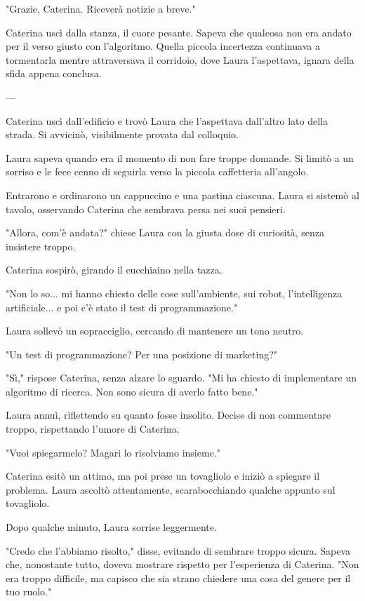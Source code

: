 "Grazie, Caterina. Riceverà notizie a breve."

Caterina uscì dalla stanza, il cuore pesante. Sapeva che qualcosa non era andato per il verso giusto con l'algoritmo. Quella piccola incertezza continuava a tormentarla mentre attraversava il corridoio, dove Laura l'aspettava, ignara della sfida appena conclusa.

---

Caterina uscì dall'edificio e trovò Laura che l'aspettava dall'altro lato della strada. Si avvicinò, visibilmente provata dal colloquio.

Laura sapeva quando era il momento di non fare troppe domande. Si limitò a un sorriso e le fece cenno di seguirla verso la piccola caffetteria all'angolo.

Entrarono e ordinarono un cappuccino e una pastina ciascuna. Laura si sistemò al tavolo, osservando Caterina che sembrava persa nei suoi pensieri.

"Allora, com'è andata?" chiese Laura con la giusta dose di curiosità, senza insistere troppo.

Caterina sospirò, girando il cucchiaino nella tazza.

"Non lo so... mi hanno chiesto delle cose sull'ambiente, sui robot, l'intelligenza artificiale... e poi c'è stato il test di programmazione."

Laura sollevò un sopracciglio, cercando di mantenere un tono neutro.

"Un test di programmazione? Per una posizione di marketing?"

"Sì," rispose Caterina, senza alzare lo sguardo. "Mi ha chiesto di implementare un algoritmo di ricerca. Non sono sicura di averlo fatto bene."

Laura annuì, riflettendo su quanto fosse insolito. Decise di non commentare troppo, rispettando l'umore di Caterina.

"Vuoi spiegarmelo? Magari lo risolviamo insieme."

Caterina esitò un attimo, ma poi prese un tovagliolo e iniziò a spiegare il problema. Laura ascoltò attentamente, scarabocchiando qualche appunto sul tovagliolo.

Dopo qualche minuto, Laura sorrise leggermente.

"Credo che l'abbiamo risolto," disse, evitando di sembrare troppo sicura. Sapeva che, nonostante tutto, doveva mostrare rispetto per l'esperienza di Caterina. "Non era troppo difficile, ma capisco che sia strano chiedere una cosa del genere per il tuo ruolo."

